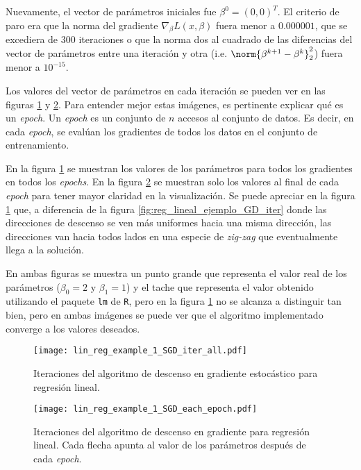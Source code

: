 Nuevamente, el vector de parámetros iniciales fue $\beta^0 = (0, 0)^T$.  El criterio de paro era que la norma del gradiente $\nabla_{\beta} L(x, \beta)$ fuera menor a $0.000001$, que se excediera de 300 iteraciones o que la norma dos al cuadrado de las diferencias del vector de parámetros entre una iteración y otra (i.e. $\norm{\beta^{k+1} - \beta^k}^2_2$) fuera menor a $10^{-15}$. 

Los valores del vector de parámetros en cada iteración se pueden ver en las figuras \ref{fig:lin_reg_example_1_SGD_iter_all} y \ref{fig:lin_reg_example_1_SGD_each_epoch}. Para entender mejor estas imágenes, es pertinente explicar qué es un \textit{epoch}. Un \textit{epoch} es un conjunto de $n$ accesos al conjunto de datos. Es decir, en cada \textit{epoch}, se evalúan los gradientes de todos los datos en el conjunto de entrenamiento.

En la figura \ref{fig:lin_reg_example_1_SGD_iter_all} se muestran los valores de los parámetros para todos los gradientes en todos los \textit{epochs}. En la figura \ref{fig:lin_reg_example_1_SGD_each_epoch} se muestran solo los valores al final de cada \textit{epoch} para tener mayor claridad en la visualización. Se puede apreciar en la figura \ref{fig:lin_reg_example_1_SGD_iter_all} que, a diferencia de la figura \ref{fig:reg_lineal_ejemplo_GD_iter} donde las direcciones de descenso se ven más uniformes hacia una misma dirección, las direcciones van hacia todos lados en una especie de \textit{zig-zag} que eventualmente llega a la solución.

En ambas figuras se muestra un punto grande que representa el valor real de los parámetros ($\beta_0=2$ y $\beta_1 = 1$) y el tache que representa el valor obtenido utilizando el paquete \texttt{lm} de \texttt{R}, pero en la figura \ref{fig:lin_reg_example_1_SGD_iter_all} no se alcanza a distinguir tan bien, pero en ambas imágenes se puede ver que el algoritmo implementado converge a los valores deseados.

\begin{figure}[H]
  \centering
  \texttt{[image: lin\_reg\_example\_1\_SGD\_iter\_all.pdf]}
  \caption{Iteraciones del algoritmo de descenso en gradiente estocástico para regresión lineal.}
  \label{fig:lin_reg_example_1_SGD_iter_all}
\end{figure}

\begin{figure}[H]
  \centering
  \texttt{[image: lin\_reg\_example\_1\_SGD\_each\_epoch.pdf]}
  \caption{Iteraciones del algoritmo de descenso en gradiente para regresión lineal. Cada flecha apunta al valor de los parámetros después de cada \textit{epoch}.}
  \label{fig:lin_reg_example_1_SGD_each_epoch}
\end{figure}



